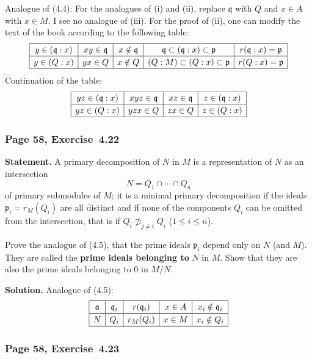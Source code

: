 \documentclass[12pt,letterpaper]{article}%
\newcommand{\mf}{\mathfrak}
\newcommand{\aaa}{\mf a}
\newcommand{\ppp}{\mf p}
\newcommand{\qqq}{\mf q}
\newcommand{\nn}{\noindent}
\begin{document}
Analogue of (4.4): For the analogues of (i) and (ii), replace $\qqq$ with $Q$ and $x\in A$ with $x\in M$. I see no analogue of (iii). For the proof of (ii), one can modify the text of the book according to the following table:  
$$
{\renewcommand{\arraystretch}{1.2}
\begin{array}{|c|c|c|c|c|}\hline
y\in(\qqq:x)&xy\in\qqq&x\notin\qqq&\qqq\subset(\qqq:x)\subset\ppp&r(\qqq:x)=\ppp\\ \hline
y\in(Q:x)&yx\in Q&x\notin Q&(Q:M)\subset(Q:x)\subset\ppp&r(Q:x)=\ppp\\ \hline
\end{array}}
$$ 
Continuation of the table:
$$
{\renewcommand{\arraystretch}{1.2}
\begin{array}{|c|c|c|c|}\hline
yz\in(\qqq:x)&xyz\in\qqq&xz\in\qqq&z\in(\qqq:x)\\ \hline
yz\in(Q:x)&yzx\in Q&zx\in Q&z\in(Q:x)\\ \hline
\end{array}}
$$ 

\subsubsection{Page 58, Exercise~4.22}%

\textbf{Statement.} A primary decomposition of $N$ in $M$ is a representation of $N$ as an intersection
$$
N=Q_1\cap\cdots\cap Q_n
$$ 
of primary submodules of $M$; it is a minimal primary decomposition if the ideals $\ppp_i=r_M(Q_i)$ are all distinct and if none of the components $Q_i$ can be omitted from the intersection, that is if $Q_i\not\supset_{j\ne i}Q_i$ ($1\le i\le n$).

Prove the analogue of (4.5), that the prime ideals $\ppp_i$ depend only on $N$ (and $M$). They are called the \textbf{prime ideals belonging to} $N$ in $M$. Show that they are also the prime ideals belonging to 0 in $M/N$.

\nn\textbf{Solution.} Analogue of (4.5): 
$$
{\renewcommand{\arraystretch}{1.2}%
\begin{array}{|c|c|c|c|c|}\hline
\aaa&\qqq_i&r(\qqq_i)&x\in A&x_i\notin\qqq_i\\ \hline 
N&Q_i&r_M(Q_i)&x\in M&x_i\notin Q_i\\ \hline
\end{array}}
$$ 

\subsubsection{Page 58, Exercise~4.23}%
\end{document}
